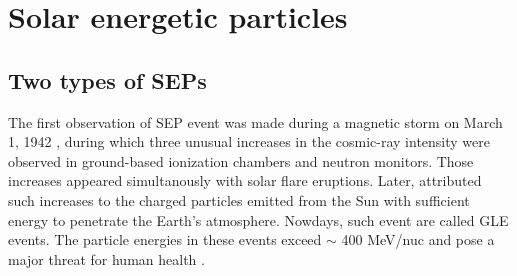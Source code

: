 

\label{chp:background}

\section{Solar energetic particles}

\subsection{Two types of SEPs}


The first observation of \ac{SEP} event was made during a magnetic storm on March 1, 1942 \citep{lange1942note,forbush1942further}, during which three unusual increases in the cosmic-ray intensity were observed in ground-based ionization chambers and neutron monitors. Those increases appeared simultanously with solar flare eruptions. Later, \citet{Forbush1946} attributed such increases to the charged particles emitted from the Sun with sufficient energy to penetrate the Earth's atmosphere. Nowdays, such event are called \ac{GLE} events. The particle energies in these events exceed $\sim$ 400 MeV/nuc and pose a major threat for human health \citep{meyer1956solar,Shea2012SSRv,gopalswamy2013first,thakur2014ground, Reames2013, Mironshnichenko2013Ge}.

